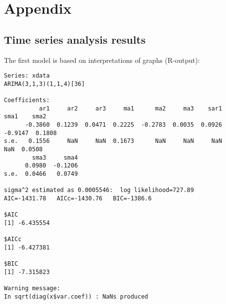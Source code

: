 \section{Appendix}


\subsection{Time series analysis results}
\label{first-R}

The first model is based on interpretations of graphs (R-output):

\begin{minipage}{1.3\textwidth}
\begin{lstlisting}
Series: xdata 
ARIMA(3,1,3)(1,1,4)[36]                    

Coefficients:
          ar1     ar2     ar3     ma1      ma2     ma3    sar1     sma1    sma2
      -0.3860  0.1239  0.0471  0.2225  -0.2783  0.0035  0.0926  -0.9147  0.1808
s.e.   0.1556     NaN     NaN  0.1673      NaN     NaN     NaN      NaN  0.0508
        sma3     sma4
      0.0980  -0.1206
s.e.  0.0466   0.0749

sigma^2 estimated as 0.0005546:  log likelihood=727.89
AIC=-1431.78   AICc=-1430.76   BIC=-1386.6

$AIC
[1] -6.435554

$AICc
[1] -6.427381

$BIC
[1] -7.315823

Warning message:
In sqrt(diag(x$var.coef)) : NaNs produced
\end{lstlisting}
\end{minipage}
